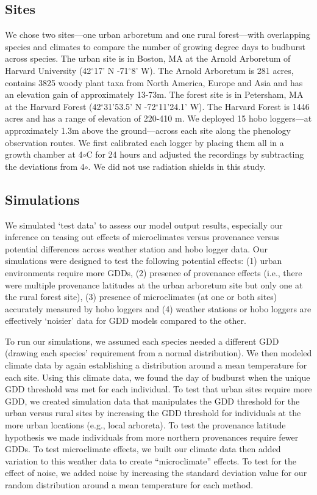 \documentclass{article}\usepackage[]{graphicx}\usepackage[]{color}
\begin{document}
\subsection*{Sites}
We chose two sites---one urban arboretum and one rural forest---with overlapping species and climates to compare the number of growing degree days to budburst across species. The urban site is in Boston, MA at the Arnold Arboretum of Harvard University (42$^{\circ}$17' N -71$^{\circ}$8' W). The Arnold Arboretum is 281 acres, contains 3825 woody plant taxa from North America, Europe and Asia and has an elevation gain of approximately 13-73m. The forest site is in Petersham, MA at the Harvard Forest (42$^{\circ}$31'53.5' N -72$^{\circ}$11'24.1' W). The Harvard Forest is 1446 acres and has a range of elevation of 220-410 m. We deployed 15 hobo loggers---at approximately 1.3m above the ground---across each site along the phenology observation routes. We first calibrated each logger by placing them all in a growth chamber at 4${\circ}$C for 24 hours and adjusted the recordings by subtracting the deviations from 4${\circ}$. We did not use radiation shields in this study.

\subsection*{Simulations}
We simulated `test data' to assess our model output results, especially our inference on teasing out effects of microclimates versus provenance versus potential differences across weather station and hobo logger data. Our simulations were designed to test the following potential effects: (1) urban environments require more GDDs, (2) presence of provenance effects (i.e., there were multiple provenance latitudes at the urban arboretum site but only one at the rural forest site), (3) presence of microclimates (at one or both sites) accurately measured by hobo loggers and (4) weather stations or hobo loggers are effectively `noisier' data for GDD models compared to the other. 

To run our simulations, we assumed each species needed a different GDD (drawing each species' requirement from a normal distribution). We then modeled climate data by again establishing a distribution around a mean temperature for each site. Using this climate data, we found the day of budburst when the unique GDD threshold was met for each individual. To test that urban sites require more GDD, we created simulation data that manipulates the GDD threshold for the urban versus rural sites by increasing the GDD threshold for individuals at the more urban locations (e.g., local arboreta). To test the provenance latitude hypothesis we made individuals from more northern provenances require fewer GDDs. To test microclimate effects, we built our climate data then added variation to this weather data to create ``microclimate'' effects.  To test for the effect of noise, we added noise by increasing the standard deviation value for our random distribution around a mean temperature for each method.
\end{document}
